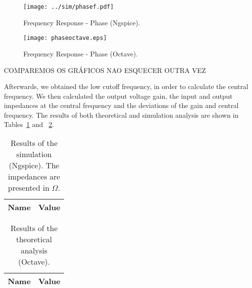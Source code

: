 \noindent
\begin{minipage}[c]{0.5\linewidth}

\begin{figure}[H] \centering
\texttt{[image: ../sim/phasef.pdf]}
\caption{Frequency Response - Phase (Ngspice).}
\label{fig:phasengspice}
\end{figure}

\end{minipage}
\begin{minipage}[c]{0.5\linewidth}

\vspace{16mm}

\begin{figure}[H] \centering
\texttt{[image: phaseoctave.eps]}
\caption{Frequency Response - Phase (Octave).}
\label{fig:phaseoctave}
\end{figure}

\end{minipage}

COMPAREMOS OS GRÁFICOS NAO ESQUECER OUTRA VEZ

\vspace{10mm}

Afterwards, we obtained the low cutoff frequency, in order to calculate the central frequency. We then calculated the output voltage gain, the input and output impedances at the central frequency and the deviations of the gain and central frequency. The results of both theoretical and simulation analysis are shown in Tables~\ref{tab:resultsngspice} and ~\ref{tab:resultsoctave}.

\vspace{5mm}

\noindent
\begin{minipage}[c]{0.5\linewidth}

\begin{table}[H]
 \centering
 \begin{tabular}{|l|r|}
 \hline
 {\bf Name} & {\bf Value} \\ \hline
 
 
 \end{tabular}
 \caption{Results of the simulation (Ngspice). The impedances are presented in $\Omega$.}
 \label{tab:resultsngspice}
 \end{table}
 
\end{minipage}
\begin{minipage}[c]{0.5\linewidth}

\vspace{-5mm}
 
 \begin{table}[H]
 \centering
 \begin{tabular}{|l|r|}
 \hline
 {\bf Name} & {\bf Value} \\ \hline
 
 \end{tabular}
 \caption{Results of the theoretical analysis (Octave).}
 \label{tab:resultsoctave}
 \end{table}
 
\end{minipage}

